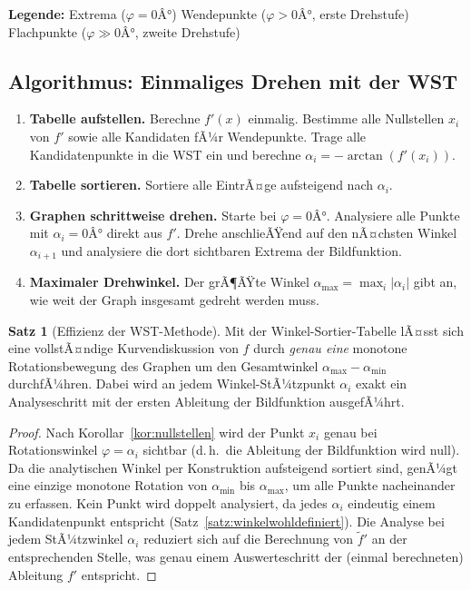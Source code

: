 ﻿\documentclass[12pt, a4paper]{article}
\theoremstyle{definition}
\newtheorem{satz}{Satz}[section]
\begin{document}
	\medskip
	\noindent\textbf{Legende:}
	\quad\colorbox{tabblue}{\phantom{X}} Extrema ($\varphi = 0Â°$)
	\quad\colorbox{tabgreen}{\phantom{X}} Wendepunkte ($\varphi > 0Â°$, erste Drehstufe)
	\quad\colorbox{taborange}{\phantom{X}} Flachpunkte ($\varphi \gg 0Â°$, zweite Drehstufe)
	
	\subsection{Algorithmus: Einmaliges Drehen mit der WST}
	
	\begin{enumerate}[label=\textbf{Phase \arabic*:}, leftmargin=*, itemsep=6pt]
		\item \textbf{Tabelle aufstellen.}
		Berechne $f'(x)$ einmalig. Bestimme alle Nullstellen $x_i$ von $f'$
		sowie alle Kandidaten fÃ¼r Wendepunkte. Trage alle Kandidatenpunkte
		in die WST ein und berechne
		$\alpha_i = -\arctan(f'(x_i))$.
		
		\item \textbf{Tabelle sortieren.}
		Sortiere alle EintrÃ¤ge aufsteigend nach $\alpha_i$.
		
		\item \textbf{Graphen schrittweise drehen.}
		Starte bei $\varphi = 0Â°$. Analysiere alle Punkte mit $\alpha_i = 0Â°$
		direkt aus $f'$. Drehe anschlieÃŸend auf den nÃ¤chsten Winkel $\alpha_{i+1}$
		und analysiere die dort sichtbaren Extrema der Bildfunktion.
		
		\item \textbf{Maximaler Drehwinkel.}
		Der grÃ¶ÃŸte Winkel $\alpha_{\max} = \max_i |\alpha_i|$ gibt an, wie weit
		der Graph insgesamt gedreht werden muss.
	\end{enumerate}
	
	\begin{satz}[Effizienz der WST-Methode]\label{satz:wst}
		Mit der Winkel-Sortier-Tabelle lÃ¤sst sich eine vollstÃ¤ndige Kurvendiskussion
		von $f$ durch \emph{genau eine} monotone Rotationsbewegung des Graphen
		um den Gesamtwinkel $\alpha_{\max} - \alpha_{\min}$ durchfÃ¼hren. Dabei wird
		an jedem Winkel-StÃ¼tzpunkt $\alpha_i$ exakt ein Analyseschritt mit der
		ersten Ableitung der Bildfunktion ausgefÃ¼hrt.
	\end{satz}
	
	\begin{proof}
		Nach Korollar~\ref{kor:nullstellen} wird der Punkt $x_i$ genau bei
		Rotationswinkel $\varphi = \alpha_i$ sichtbar (d.\,h.\ die Ableitung der
		Bildfunktion wird null). Da die analytischen Winkel per Konstruktion
		aufsteigend sortiert sind, genÃ¼gt eine einzige monotone Rotation von
		$\alpha_{\min}$ bis $\alpha_{\max}$, um alle Punkte nacheinander zu erfassen.
		Kein Punkt wird doppelt analysiert, da jedes $\alpha_i$ eindeutig einem
		Kandidatenpunkt entspricht (Satz~\ref{satz:winkelwohldefiniert}).
		Die Analyse bei jedem StÃ¼tzwinkel $\alpha_i$ reduziert sich auf die
		Berechnung von $\tilde{f}'$ an der entsprechenden Stelle, was genau einem
		Auswerteschritt der (einmal berechneten) Ableitung $f'$ entspricht.
	\end{proof}
	
\end{document}
